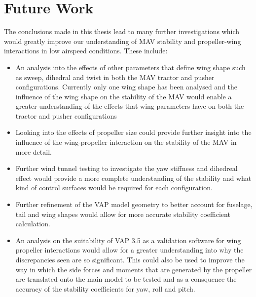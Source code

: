 \section{Future Work}
The conclusions made in this thesis lead to many further investigations which would greatly improve our understanding of \acrshort{MAV} stability and propeller-wing interactions in low airspeed conditions. These include:

\begin{itemize}
    \item An analysis into the effects of other parameters that define wing shape such as sweep, dihedral and twist in both the \acrshort{MAV} tractor and pusher configurations. Currently only one wing shape has been analysed and the influence of the wing shape on the stability of the MAV would enable a greater understanding of the effects that wing parameters have on both the tractor and pusher configurations 

    \item Looking into the effects of propeller size could provide further insight into the influence of the wing-propeller interaction on the stability of the MAV in more detail. 


    \item Further wind tunnel testing to investigate the yaw stiffness and dihedreal effect would provide a more complete understanding of the stability and what kind of control surfaces would be required for each configuration.

    \item Further refinement of the VAP model geometry to better account for fuselage, tail and wing shapes would allow for more accurate stability coefficient calculation.
    
    \item An analysis on the suitability of VAP 3.5 as a validation software for wing propeller interactions would allow for a greater understanding into why the discrepancies seen are so significant. This could also be used to improve the way in which the side forces and moments that are generated by the propeller are translated onto the main model to be tested and as a consquence the accuracy of the stability coefficients for yaw, roll and pitch.

    
\end{itemize}